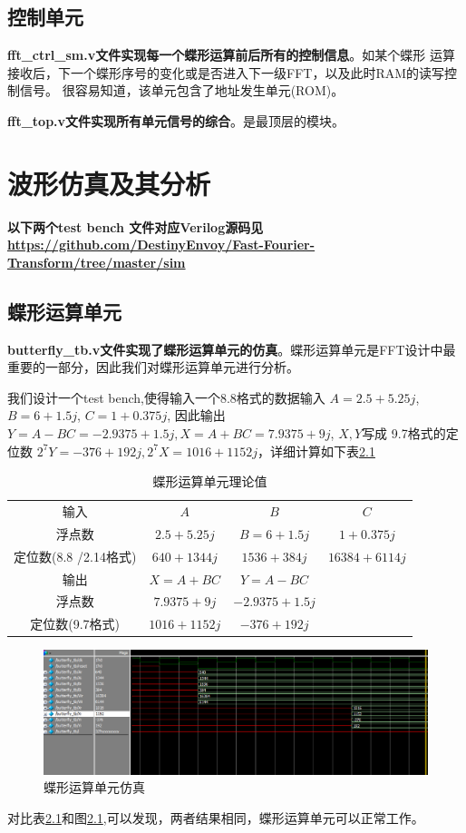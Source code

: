 \section{控制单元}

\textbf{fft\_ctrl\_sm.v文件实现每一个蝶形运算前后所有的控制信息}。如某个蝶形
运算接收后，下一个蝶形序号的变化或是否进入下一级FFT，以及此时RAM的读写控制信号。
很容易知道，该单元包含了地址发生单元(ROM)。

\textbf{fft\_top.v文件实现所有单元信号的综合}。是最顶层的模块。

\chapter{波形仿真及其分析}

\textbf{以下两个test bench 文件对应Verilog源码见 \url{https://github.com/DestinyEnvoy/Fast-Fourier-Transform/tree/master/sim}}

\section{蝶形运算单元}

\textbf{butterfly\_tb.v文件实现了蝶形运算单元的仿真}。蝶形运算单元是FFT设计中最重要的一部分，因此我们对蝶形运算单元进行分析。

我们设计一个test bench,使得输入一个8.8格式的数据输入 $A=2.5+5.25j$, $B=6+1.5j$, $C=1+0.375j$,
因此输出 $Y=A-BC=-2.9375+1.5j,X=A+BC=7.9375+9j$,  $X,Y$写成
9.7格式的定位数 $2^7Y=-376+192j,2^7X=1016+1152j$，详细计算如下表\ref{tab:value}

\begin{table}[H]
    \centering
    \caption{蝶形运算单元理论值}
    \label{tab:value}
    \begin{tabular}{|cccc|}
        \hline
        输入 & $A$ & $B$ & $C$\\ 
        浮点数 &  $2.5+5.25j$ &  $B=6+1.5j$ & $1+0.375j$ \\
        定位数(8.8 /2.14格式) & $640+1344j$ & $1536+384j$ & $16384+6114j$\\
        \hline
        输出 & $X=A+BC$ &  $Y=A-BC$ &  \\
        浮点数 & $7.9375+9j$ &  $-2.9375+1.5j$ &\\
        定位数(9.7格式) &  $1016+1152j$ &  $-376+192j$ &\\ \hline
    \end{tabular}
\end{table}
\begin{figure}[H]
    \centering
    \includegraphics[width=0.9\linewidth]{Figure/buttery_sim.png}
    \caption{蝶形运算单元仿真}%
    \label{fig:but_sim}
\end{figure}
对比表\ref{tab:value}和图\ref{fig:but_sim},可以发现，两者结果相同，蝶形运算单元可以正常工作。

